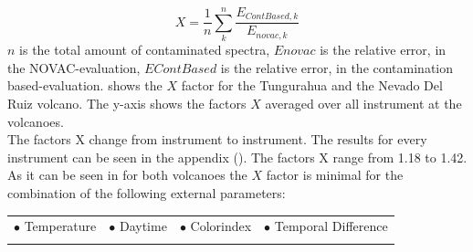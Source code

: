 \documentclass  [
  paper    = a4,
  BCOR     = 10mm,
  twoside,
  fontsize = 12pt,
  fleqn,
  toc      = bibnumbered,
  toc      = listofnumbered,
  numbers  = noendperiod,
  headings = normal,
  listof   = leveldown,
  version  = 3.03
]                                       {scrreprt}
\begin{document}
	\begin{equation}
	X = \frac{1}{n}\sum_{k}^{n} \frac{E_{ContBased, k}}{E_{novac,k}}
	\label{eq:mean}
	\end{equation}
	$n$ is the total amount of contaminated spectra, $Enovac$ is the relative   error, in the NOVAC-evaluation, $EContBased$ is the relative   error, in the contamination based-evaluation. 
	 shows the $X$ factor for the Tungurahua and the Nevado Del Ruiz volcano. The y-axis shows the factors $X$ averaged over all instrument at the volcanoes.\\
	The factors X change from instrument to instrument. The results for every instrument can be seen in the appendix (). The factors X range from 1.18 to 1.42.\\

	As it can be seen in   for both volcanoes the $X$ factor is minimal for the combination of the following external parameters:\\
	
	\begin{table}[h!]
			\begin{tabular}{cccc}
		$\bullet$ Temperature & $\bullet$ Daytime&  $\bullet$ Colorindex & $\bullet$ Temporal Difference\\
		\label{tab:importantexternalParam}
		\end{tabular}
	\end{table}
%	
\end{document}

